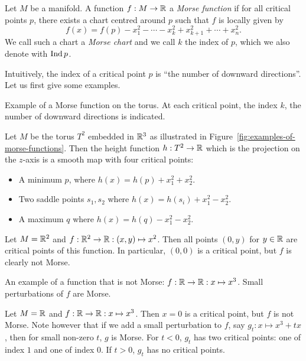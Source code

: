 \begin{definition}
    Let $M$ be a manifold. A function $f: M \to  \mathbb{R}$ a \emph{Morse function} if for all critical points $p$, there exists a chart centred around $p$ such that $f$ is locally given by
    \[
        f(x) = f(p) -x_1^2 - \cdots - x_k^2 + x_{k+1}^2 + \cdots + x_n^2
    .\] 
    We call such a chart a \emph{Morse chart} and we call $k$ the index of $p$, which we also denote with $\operatorname{Ind} p$.
    
\end{definition}
Intuitively, the index of a critical point $p$ is ``the number of downward directions''.
Let us first give some examples.
\begin{marginfigure}
    \centering
    \caption{Example of a Morse function on the torus. At each critical point, the index $k$, the number of downward directions is indicated. }
    \label{fig:examples-of-morse-functions}
\end{marginfigure}
\begin{eg}
    Let $M$ be the torus  $T^2$ embedded in $\mathbb{R}^3$ as illustrated in Figure~\ref{fig:examples-of-morse-functions}.
    Then the height function $h: T^2 \to  \mathbb{R}$ which is the projection on the $z$-axis is a smooth map with four critical points:
    \begin{itemize}
        \item A minimum $p$, where $h(x) = h(p) + x_1^2 + x_2^2$.
        \item Two saddle points $s_1, s_2$ where $h(x) = h(s_i) + x_1^2 - x_2^2$.
        \item A maximum $q$ where $h(x) = h(q) - x_1^2 - x_2^2$.
    \end{itemize}
\end{eg}

\begin{noneg}
    Let $M = \mathbb{R}^2$ and $f: \mathbb{R}^2 \to  \mathbb{R}: (x, y) \mapsto  x^2$.
    Then all points $(0, y)$ for  $y \in \mathbb{R}$ are critical points of this function.
    In particular, $(0, 0)$ is a critical point, but $f$ is clearly not Morse.
\end{noneg}
\begin{marginfigure}
    \centering
    \caption{}
    \label{fig:non-example-of-morse-function}
\end{marginfigure}
\begin{marginfigure}
    \centering
    \caption{An example of a function that is not Morse: $f: \mathbb{R} \to  \mathbb{R}: x \mapsto  x^3$.
        Small perturbations of $f$ are Morse.
    }
    \label{fig:non-examples-of-morse-functions}
\end{marginfigure}
\begin{noneg}
    Let $M = \mathbb{R}$ and $f : \mathbb{R} \to  \mathbb{R}: x \mapsto x^3$.
    Then $x = 0$ is a critical point, but $f$ is not Morse.
    Note however that if we add a small perturbation to $f$, say $g_t: x\mapsto x^3+ tx$, then for small non-zero $t$, $g$ is Morse. For $t < 0$, $g_t$  has two critical points: one of index $1$ and one of index $0$.
    If $t > 0$,  $g_t$ has no critical points.
\end{noneg}

